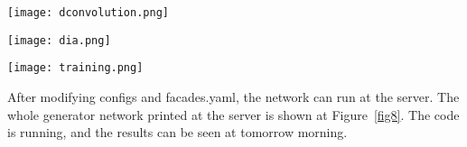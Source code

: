 \documentclass[a4paper]{article}
\begin{document}
\begin{figure*}
\begin{center}
\texttt{[image: dconvolution.png]}
\end{center}
\caption{The forward propagation of dilation convolution network.}
\label{fig7}
\end{figure*}

\begin{figure*}
\begin{center}
\texttt{[image: dia.png]}
\end{center}
\caption{The layers of the whole dilation convolution network.}
\label{fig8}
\end{figure*}

\begin{figure*}
\begin{center}
\texttt{[image: training.png]}
\end{center}
\caption{The training procedure of DRPAN adding dilation convolutions.}
\label{fig9}
\end{figure*}

After modifying configs and facades.yaml, the network can run at the server. The whole generator network printed at the server is shown at Figure~\ref{fig8}. The code is running, and the results can be seen at tomorrow morning.







{\small


}
\end{document}
